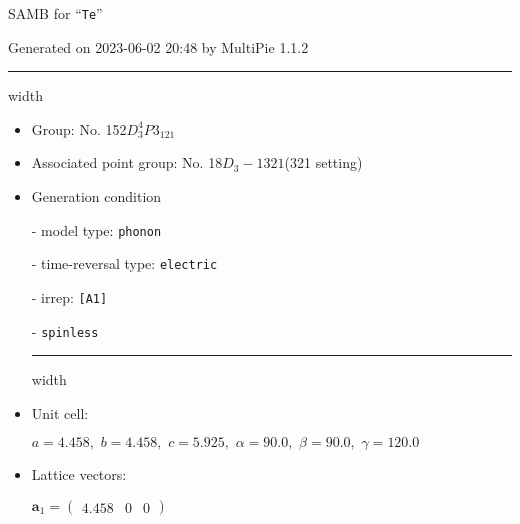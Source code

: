 \documentclass[fleqn,10pt,landscape]{article}
\begin{document}
\setcounter{MaxMatrixCols}{16}

\setlength{\baselineskip}{16pt}
\footnotesize
\begin{center}
\LARGE
SAMB for ``\texttt{Te}''
\end{center}
\begin{flushright}
Generated on 2023-06-02 20:48 by MultiPie 1.1.2
\end{flushright}
\vspace{1cm}


 \hfil \hrule height 1mm width \textwidth \hfil

\begin{itemize}
\item Group: No. 152\quad$D_{3}^{4}$\quad$P3_121$\quad[ trigonal ]

\item Associated point group: No. 18\quad$D_{3}-1$\quad$321$\quad(321 setting)\quad[ trigonal ]

\vspace{5mm}

\item Generation condition

\quad - model type: \texttt{phonon}

\quad - time-reversal type: \texttt{electric}

\quad - irrep: \texttt{[A1]}

\quad - \texttt{spinless}


 \hfil \hrule height 1mm width \textwidth \hfil

\item Unit cell:

\quad $a=4.458,\,\, b=4.458,\,\, c=5.925,\,\, \alpha=90.0,\,\, \beta=90.0,\,\, \gamma=120.0$

\item Lattice vectors:

\quad $\bm{a}_1=\begin{pmatrix} 4.458 & 0 & 0 \end{pmatrix}$


\end{itemize}
\end{document}
